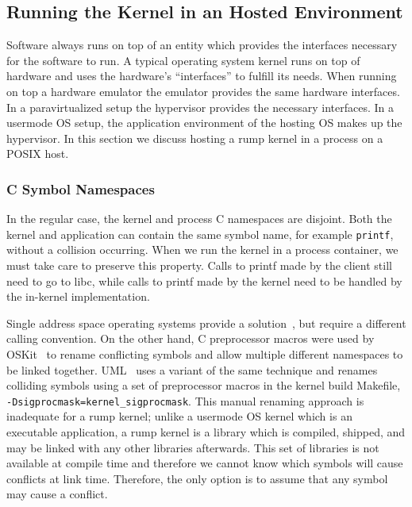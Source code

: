 \subsection{Running the Kernel in an Hosted Environment}

Software always runs on top of an entity which provides the interfaces
necessary for the software to run.  A typical operating system
kernel runs on top of hardware and uses the hardware's ``interfaces''
to fulfill its needs.  When running on top a hardware emulator the
emulator provides the same hardware interfaces.  In a paravirtualized
setup the hypervisor provides the necessary interfaces.  In a
usermode OS setup, the application environment of the hosting OS
makes up the hypervisor.  In this section we discuss hosting a rump
kernel in a process on a POSIX host.

\subsubsection{C Symbol Namespaces}
\label{chap:rumpns}

In the regular case, the kernel and process C namespaces are disjoint.
Both the kernel and application can contain the same symbol name,
for example \texttt{printf}, without a collision occurring.  When we
run the kernel in a process container, we must take care to preserve
this property.  Calls to printf made by the client still need to go to
libc, while calls to printf made by the kernel need to be handled by
the in-kernel implementation.

Single address space operating systems provide a
solution~\cite{deller:sasoslink}, but require a different calling
convention.  On the other hand, C preprocessor macros were used by
OSKit~\cite{ford:oskit} to rename conflicting symbols and allow multiple
different namespaces to be linked together.  UML~\cite{dike:uml}
uses a variant of the same technique and renames colliding symbols
using a set of preprocessor macros in the kernel build Makefile,
\eg \verb+-Dsigprocmask=kernel_sigprocmask+.  This manual renaming
approach is inadequate for a rump kernel; unlike a usermode OS kernel
which is an executable application, a rump kernel is a library which is
compiled, shipped, and may be linked with any other libraries afterwards.
This set of libraries is not available at compile time and therefore we
cannot know which symbols will cause conflicts at link time.  Therefore,
the only option is to assume that any symbol may cause a conflict.

